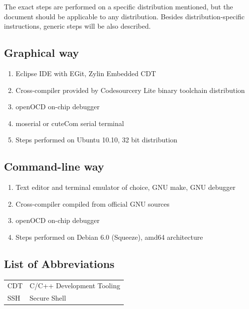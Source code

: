 \documentclass[a4paper, 10pt]{article}
\begin{document}
The exact steps are performed on a specific distribution mentioned, but the
document should be applicable to any distribution. Besides distribution-specific
instructions, generic steps will be also described.

\subsection{Graphical way}

\begin{enumerate}
\item Eclipse IDE with EGit, Zylin Embedded CDT
\item Cross-compiler provided by Codesourcery Lite binary toolchain
	distribution
\item openOCD on-chip debugger
\item moserial or cuteCom serial terminal
\item Steps performed on Ubuntu 10.10, 32 bit distribution
\end{enumerate}

\subsection{Command-line way}

\begin{enumerate}
\item Text editor and terminal emulator of choice, GNU make, GNU debugger
\item Cross-compiler compiled from official GNU sources
\item openOCD on-chip debugger
\item Steps performed on Debian 6.0 (Squeeze), amd64 architecture
\end{enumerate}

\newpage

\tableofcontents
\newpage

\listoffigures
\newpage

\subsection*{List of Abbreviations}
	\begin{tabular}{ l l }
    CDT	    & C/C++ Development Tooling \\
	SSH		& Secure Shell \\
	\end{tabular}
\newpage
\end{document}
